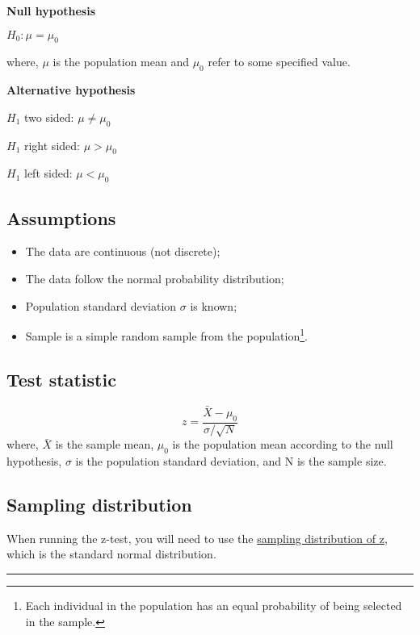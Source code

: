 \documentclass[
]{article}
\providecommand{\tightlist}{%
  \setlength{\itemsep}{0pt}\setlength{\parskip}{0pt}}
\begin{document}
\textbf{Null hypothesis}

\(H_0:\mu = \mu_0\)

where, \(\mu\) is the population mean and \(\mu_0\) refer to some specified value.

\textbf{Alternative hypothesis}

\(H_1\) two sided: \(\mu \ne \mu_0\)

\(H_1\) right sided: \(\mu > \mu_0\)

\(H_1\) left sided: \(\mu < \mu_0\)

\hypertarget{assumptions}{%
\subsection{Assumptions}\label{assumptions}}

\begin{itemize}
\tightlist
\item
  The data are continuous (not discrete);
\item
  The data follow the normal probability distribution;
\item
  Population standard deviation \(\sigma\) is known;
\item
  Sample is a simple random sample from the population\footnote{Each individual in the population has an equal probability of being selected in the sample.}.
\end{itemize}

\hypertarget{test-statistic}{%
\subsection{Test statistic}\label{test-statistic}}

\[
z = \dfrac{\bar{X} - \mu_0}{\sigma / \sqrt{N}}
\] where, \(\bar{X}\) is the sample mean, \(\mu_0\) is the population mean according to the null hypothesis, \(\sigma\) is the population standard deviation, and N is the sample size.

\hypertarget{sampling-distribution}{%
\subsection{Sampling distribution}\label{sampling-distribution}}

When running the z-test, you will need to use the \href{https://statkat.com/sampling-distribution/one-sample-z-test/z.php}{sampling distribution of z}, which is the standard normal distribution.

\begin{center}\rule{0.5\linewidth}{0.5pt}\end{center}
\end{document}
